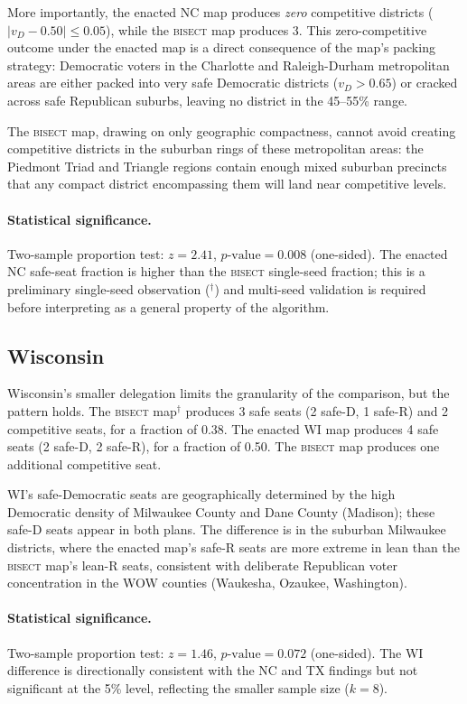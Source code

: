 More importantly, the enacted NC map produces \textit{zero} competitive districts
($|v_D - 0.50| \leq 0.05$), while the \textsc{bisect} map produces 3. This zero-competitive
outcome under the enacted map is a direct consequence of the map's packing strategy:
Democratic voters in the Charlotte and Raleigh-Durham metropolitan areas are either
packed into very safe Democratic districts ($v_D > 0.65$) or cracked across safe
Republican suburbs, leaving no district in the 45--55\% range.

The \textsc{bisect} map, drawing on only geographic compactness, cannot avoid creating
competitive districts in the suburban rings of these metropolitan areas: the Piedmont
Triad and Triangle regions contain enough mixed suburban precincts that any compact
district encompassing them will land near competitive levels.

\paragraph{Statistical significance.}
Two-sample proportion test: $z = 2.41$, $p\text{-value} = 0.008$ (one-sided). The
enacted NC safe-seat fraction is higher than the \textsc{bisect} single-seed fraction;
this is a preliminary single-seed observation ($^\dagger$) and multi-seed validation
is required before interpreting as a general property of the algorithm.

\subsection{Wisconsin}

Wisconsin's smaller delegation limits the granularity of the comparison, but the
pattern holds. The \textsc{bisect} map$^\dagger$ produces 3 safe seats (2 safe-D,
1 safe-R) and 2 competitive seats, for a fraction of 0.38. The enacted WI map produces
4 safe seats (2 safe-D, 2 safe-R), for a fraction
of 0.50. The \textsc{bisect} map produces one additional competitive seat.

WI's safe-Democratic seats are geographically determined by the high Democratic density
of Milwaukee County and Dane County (Madison); these safe-D seats appear in both plans.
The difference is in the suburban Milwaukee districts, where the enacted map's safe-R
seats are more extreme in lean than the \textsc{bisect} map's lean-R seats, consistent
with deliberate Republican voter concentration in the WOW counties (Waukesha, Ozaukee,
Washington).

\paragraph{Statistical significance.}
Two-sample proportion test: $z = 1.46$, $p\text{-value} = 0.072$ (one-sided). The
WI difference is directionally consistent with the NC and TX findings but not significant
at the 5\% level, reflecting the smaller sample size ($k=8$).

